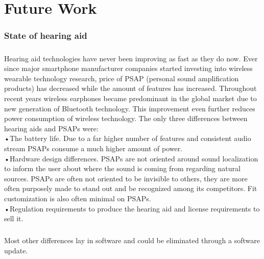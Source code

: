 \chapter{Future Work}\label{FutureWork}
\subsection{State of hearing aid}
\paragraph{}
Hearing aid technologies have never been improving as fast as they do now. Ever since major smartphone manufacturer companies started investing into wireless wearable technology research, price of PSAP (personal sound amplification products) has decreased while the amount of features has increased. Throughout recent years wireless earphones became predominant in the global market due to new generation of Bluetooth technology. This improvement even further reduces power consumption of wireless technology. The only three differences between hearing aids and PSAPs were: \\

•The battery life. Due to a far higher number of features and consistent audio stream PSAPs consume a much higher amount of power.\\

•Hardware design differences. PSAPs are not oriented around sound localization to inform the user about where the sound is coming from regarding natural sources. PSAPs are often not oriented to be invisible to others, they are more often purposely made to stand out and be recognized among its competitors. Fit customization is also often minimal on PSAPs.\\

•Regulation requirements to produce the hearing aid and license requirements to sell it.

\paragraph{} 
Most other differences lay in software and could be eliminated through a software update.

